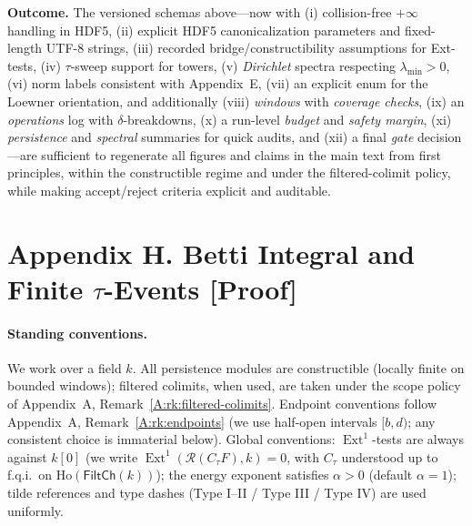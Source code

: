 \documentclass[11pt]{article}
\DeclareMathOperator{\Ext}{Ext}
\newcommand{\Ho}{\mathrm{Ho}}
\numberwithin{equation}{section}
\theoremstyle{definition}
\begin{document}
\medskip
\noindent\textbf{Outcome.}
The versioned schemas above—now with (i) collision-free \(+\infty\) handling in HDF5,
(ii) explicit HDF5 canonicalization parameters and fixed-length UTF-8 strings, (iii) recorded bridge/constructibility
assumptions for Ext-tests, (iv) \(\tau\)-sweep support for towers, (v) \emph{Dirichlet} spectra respecting
\(\lambda_{\min}>0\), (vi) norm labels consistent with Appendix~E, (vii) an explicit enum for the Loewner orientation,
and additionally (viii) \emph{windows} with \emph{coverage checks}, (ix) an \emph{operations} log with \(\delta\)-breakdowns,
(x) a run-level \emph{budget} and \emph{safety margin}, (xi) \emph{persistence} and \emph{spectral} summaries for quick audits,
and (xii) a final \emph{gate} decision—are sufficient to regenerate all figures and claims in the main text from first principles,
within the constructible regime and under the filtered-colimit policy, while making accept/reject criteria explicit and auditable.



\section*{Appendix H. Betti Integral and Finite $\tau$-Events [Proof]}
{}
\label{H:betti-integral}

\paragraph{Standing conventions.}
We work over a field \(k\). All persistence modules are constructible (locally finite on bounded windows); filtered colimits, when used, are taken under the scope policy of Appendix~A, Remark~\ref{A:rk:filtered-colimits}. Endpoint conventions follow Appendix~A, Remark~\ref{A:rk:endpoints} (we use half-open intervals \([b,d)\); any consistent choice is immaterial below). Global conventions: \(\Ext^1\)-tests are always against \(k[0]\) (we write \(\Ext^1(\mathcal{R}(C_\tau F),k)=0\), with \(C_\tau\) understood up to f.q.i.\ on \(\Ho(\mathsf{FiltCh}(k))\)); the energy exponent satisfies \(\alpha>0\) (default \(\alpha=1\)); tilde references and type dashes (Type I--II / Type III / Type IV) are used uniformly.
\end{document}
